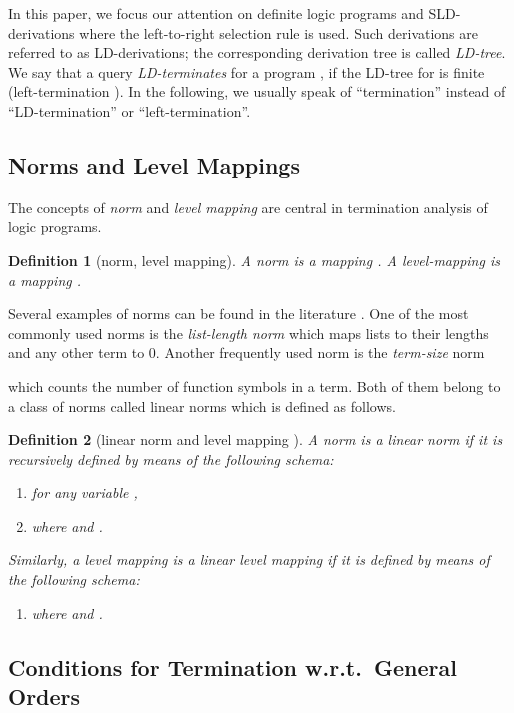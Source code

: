 \documentclass[envcountsame]{tlp}
\newcounter{ex:der-lastsymconsctr}
\newtheorem{definition}{Definition}
\begin{document}
In this paper, we focus our attention on definite logic programs and SLD-derivations
where the left-to-right selection rule is used. Such derivations are referred to as
LD-derivations; the corresponding derivation tree is called \emph{LD-tree}. We say that a
query  \emph{LD-terminates} for a program , if the LD-tree for  is finite
(left-termination \cite{Lloyd87}). In the following, we usually speak of ``termination''
instead of ``LD-termination'' or ``left-termination''.

\subsection{Norms and Level Mappings}\label{subsec:norm&levelmapping}

The concepts of \emph{norm} and \emph{level mapping} are central in termination analysis
of logic programs.

\begin{definition}[norm, level mapping]\label{def:norm&levelmapping}
A \emph{norm} is a mapping . A \emph{level-mapping} is a mapping .
\end{definition}

Several examples of norms can be found in the literature \cite{Bossietal91}. One of the
most commonly used norms is the \emph{list-length norm}
 which maps lists to their lengths 
and any other term to 0. Another frequently used norm is the \emph{term-size} norm

which counts
the number of function symbols in a term. Both of them belong to a class of norms called
linear norms which is defined as follows.

\begin{definition}[linear norm and level mapping \cite{Serebrenik03}] \label{def:linearnorm}
A norm  is a \emph{linear} norm if it is recursively defined by
means of the following schema:
\begin{enumerate}
\item[-] for any variable ,
\item[-] where  and .
\end{enumerate}
Similarly, a level mapping  is a \emph{linear} level mapping if it is
defined by means of the following schema:
\begin{enumerate}
\item[-] where  and .
\end{enumerate}
\end{definition}
\subsection{Conditions for Termination w.r.t.\ General Orders}\label{subsec:conditions}
\end{document}
